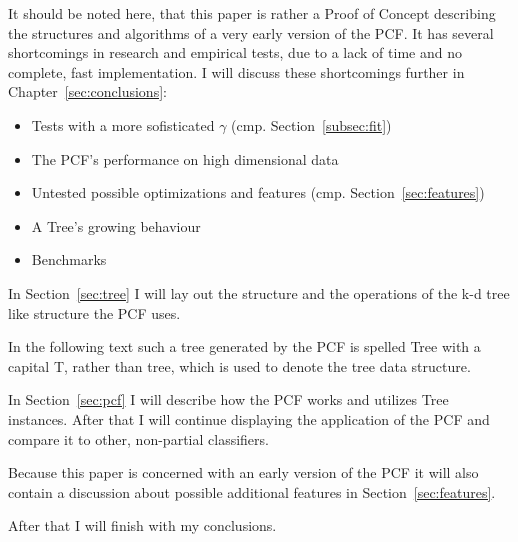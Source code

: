 It should be noted here, that this paper is rather a Proof
of Concept describing the structures and algorithms of a
very early version of the PCF. It has several shortcomings
in research and empirical tests, due to a lack of time and
no complete, fast implementation. I will discuss these
shortcomings further in Chapter~\ref{sec:conclusions}:

\begin{itemize}

\item Tests with a more sofisticated $\gamma$ (cmp.
      Section~\ref{subsec:fit})

\item The PCF's performance on high dimensional data

\item Untested possible optimizations and features (cmp.
      Section~\ref{sec:features})

\item A Tree's growing behaviour

\item Benchmarks

\end{itemize}

In Section~\ref{sec:tree} I will lay out
the structure and the operations of the k-d tree like
structure the PCF uses.

In the following text such a tree generated by the PCF is
spelled Tree with a capital T, rather than tree, which is
used to denote the tree data structure.

In Section~\ref{sec:pcf} I will describe how the PCF works
and utilizes Tree instances. After that I will continue
displaying the application of the PCF and compare it to
other, non-partial classifiers.

Because this paper is concerned with an early version of
the PCF it will also contain a discussion about possible
additional features in Section~\ref{sec:features}.

After that I will finish with my conclusions.
